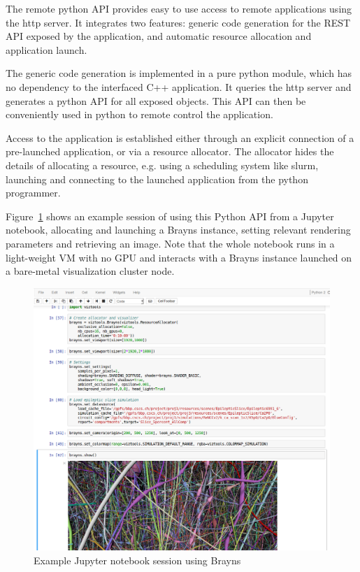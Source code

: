 \documentclass[10pt]{llncs}
\newcommand{\fig}[1]{Figure~\ref{#1}}
\begin{document}
The remote python API provides easy to use access to remote applications using
the http server. It integrates two features: generic code generation for the
REST API exposed by the application, and automatic resource allocation and
application launch.

The generic code generation is implemented in a pure python module, which has
no dependency to the interfaced C++ application. It queries the http server and
generates a python API for all exposed objects. This API can then be
conveniently used in python to remote control the application.

Access to the application is established either through an explicit connection
of a pre-launched application, or via a resource allocator. The allocator hides
the details of allocating a resource, e.g. using a scheduling system like
slurm, launching and connecting to the launched application from the python
programmer.

\fig{fJupyter} shows an example session of using this Python API from a Jupyter
notebook, allocating and launching a Brayns instance, setting relevant rendering
parameters and retrieving an image. Note that the whole notebook runs in a
light-weight VM with no GPU and interacts with a Brayns instance launched on a
bare-metal visualization cluster node.

\begin{figure}[ht]\center
  \includegraphics[width=\columnwidth]{images/jupyter}
  \caption{\label{fJupyter}Example Jupyter notebook session using Brayns}
\end{figure}
\end{document}
